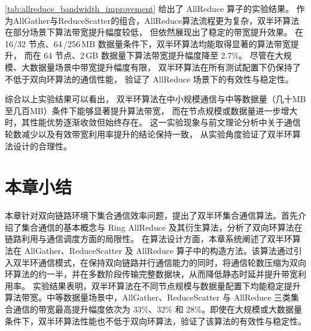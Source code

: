 \autoref{tab:allreduce_bandwidth_improvement} 给出了 AllReduce 算子的实验结果。
作为AllGather与ReduceScatter的组合，AllReduce算法流程更为复杂，双半环算法在部分场景下算法带宽提升幅度较低，
但依然展现出了稳定的带宽提升效果。
在 16/32 节点、64\,/256\,MB 数据量条件下，双半环算法均能取得显著的算法带宽提升，
而在 64 节点、2\,GB 数据量下算法带宽提升幅度降至 2.7\%。
尽管在大规模、大数据量场景中带宽提升幅度有限，
双半环算法在所有测试配置下仍保持了不低于双向环算法的通信性能，
验证了 AllReduce 场景下的有效性与稳定性。

综合以上实验结果可以看出，
双半环算法在中小规模通信与中等数据量（几十MB至几百MB）条件下能够显著提升算法带宽，
而在节点规模或数据量进一步增大时，其性能优势逐渐收敛但始终存在。
这一实验现象与前文理论分析中关于通信轮数减少以及有效带宽利用率提升的结论保持一致，
从实验角度验证了双半环算法设计的合理性。



\section{本章小结}





本章针对双向链路环境下集合通信效率问题，提出了双半环集合通信算法。首先介绍了集合通信的基本概念与 Ring AllReduce 及其衍生算法，分析了双向环算法在链路利用与通信调度方面的局限性。
在算法设计方面，本章系统阐述了双半环算法在 AllGather、ReduceScatter 及 AllReduce 算子中的构造方法。该算法通过引入双半环通信模式，在保持双向链路并行通信能力的同时，将通信轮数压缩为双向环算法的约一半，并在多数阶段传输完整数据块，从而降低静态时延并提升带宽利用率。
实验结果表明，双半环算法在不同节点规模与数据量配置下均能稳定提升算法带宽。中等数据量场景中，AllGather、ReduceScatter 与 AllReduce 三类集合通信的带宽最高提升幅度依次为 33\%、32\% 和 28\%。即使在大规模或大数据量条件下，双半环算法性能也不低于双向环算法，验证了该算法的有效性与稳定性。
